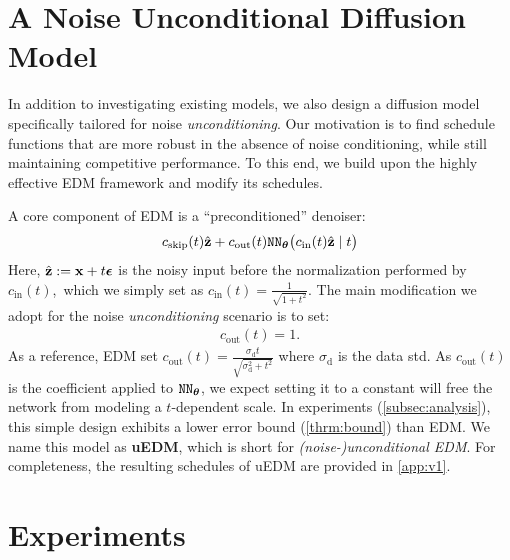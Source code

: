 
\section{A Noise Unconditional Diffusion Model}\label{p:edmv1}

In addition to investigating existing models, we also design a diffusion model specifically tailored for noise \textit{unconditioning}.
Our motivation is to find schedule functions that are more robust in the absence of noise conditioning, while still maintaining competitive performance. To this end, we build upon the highly effective EDM framework \cite{karras2022edm} and modify its schedules.

A core component of EDM is a ``preconditioned'' denoiser:
\begin{align*}
 c_{\text{skip}}(t)\hat{\rvz}+c_{\text{out}}(t)\net_{\vtheta}\big(c_{\text{in}}(t)\hat{\rvz} \mid t\big)
\vspace{-1em}
\end{align*}
Here, $\hat{{\mathbf{z}}} := {\mathbf{x}} + t {\bm{\epsilon}} $ is the noisy input before the normalization performed by $c_{\text{in}}(t)$,\footnotemark~which we simply set as $c_{\text{in}}(t) = \frac{1}{\sqrt{1+t^2}}$.
The main modification we adopt for the noise \textit{unconditioning} scenario is to set:
\begin{align*}
c_{\text{out}}(t) = 1.
\end{align*}
As a reference, EDM set $c_{\text{out}}(t) = \frac{\sigma_\text{d}t}{\sqrt{\sigma^2_\text{d}+t^2}}$ where $\sigma_\text{d}$ is the data std.
As $c_{\text{out}}(t)$ is the coefficient applied to ${\texttt{NN}}_{{\bm{\theta}}}$, we expect setting it to a constant will free the network from modeling a $t$-dependent scale.
In experiments (\cref{subsec:analysis}), this simple design exhibits a lower error bound (\cref{thrm:bound}) than EDM. 
We name this model as \textbf{uEDM}, which is short for \textit{\mbox{(noise-)}unconditional EDM}.
For completeness, the resulting schedules of uEDM are provided in \cref{app:v1}. 



\section{Experiments}\label{method}

